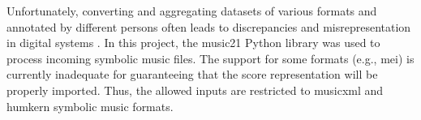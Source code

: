 

Unfortunately, converting and aggregating datasets of
various formats and annotated by different persons often
leads to discrepancies and misrepresentation in digital
systems \parencite{napoleslopez2018encoding,
napoleslopez2019effects}. In this project, the music21
Python library \parencite{cuthbert2010music21} was used to
process incoming symbolic music files. The support for some
formats (e.g., \gls{mei}) is currently inadequate for
guaranteeing that the score representation will be properly
imported. Thus, the allowed inputs are restricted to
\gls{musicxml} and \gls{humkern} symbolic music formats.
